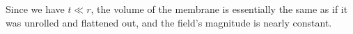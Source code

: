 Since we have $t\ll r$, the volume of the membrane is essentially  
the same as if it was unrolled and flattened out, and the
field's magnitude is nearly constant.
